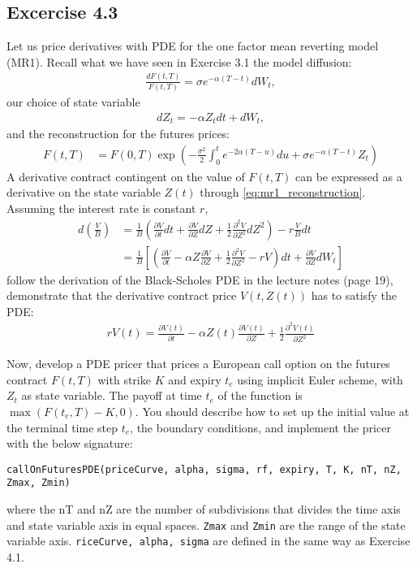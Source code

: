 \documentclass[10pt,a4paper,hidelinks,fleqn]{article}            %
\begin{document}
\subsection*{Excercise 4.3}
Let us price derivatives with PDE for the one factor mean reverting model (MR1). 
Recall what we have seen in Exercise 3.1 the model diffusion:
\begin{align*}
\frac{dF(t, T)}{F(t, T)} = \sigma e^{-\alpha (T- t)} dW_t,
\end{align*}
our choice of state variable
\begin{align}
dZ_t = -\alpha Z_t dt + dW_t,
\end{align}
and the reconstruction for the futures prices:
\begin{align}
F(t, T) & = F(0, T) \exp\left( -\frac{\sigma^2}{2} \int_0^t e^{-2\alpha (T - u)} du + \sigma e^{-\alpha(T-t)} Z_t \right)
\label{eq:mr1_reconstruction}
\end{align}
A derivative contract contingent on the value of $F(t, T)$ can be expressed as a derivative on the state variable $Z(t)$ through \eqref{eq:mr1_reconstruction}.
Assuming the interest rate is constant $r$,
\begin{align}
d\left(\frac{V}{B}\right) & = \frac{1}{B}\left(\frac{\partial V}{\partial t} dt + \frac{\partial V}{\partial Z} dZ + \frac{1}{2}\frac{\partial^2 V}{\partial Z^2} dZ^2 \right) - r\frac{V}{B}dt  \\
   & = \frac{1}{B} \left[\left(\frac{\partial V}{\partial t} - \alpha Z\frac{\partial V}{\partial Z} + \frac{1}{2} \frac{\partial^2 V}{\partial Z^2} - rV\right)dt + \frac{\partial V}{\partial Z} dW_t \right]
\end{align}
follow the derivation of the Black-Scholes PDE in the lecture notes (page 19),
demonstrate that the derivative contract price $V(t, Z(t))$ has to satisfy the PDE:
\begin{align}
rV(t) = \frac{\partial V(t)}{\partial t} - \alpha Z(t) \frac{\partial V(t)}{\partial Z} + \frac{1}{2} \frac{\partial^2 V(t)}{\partial Z^2}
\end{align}


Now, develop a PDE pricer that prices a European call option on the futures contract $F(t, T)$ with strike $K$ and expiry $t_e$ using implicit Euler scheme, with $Z_t$ as state variable.
The payoff at time $t_e$ of the function is $\max(F(t_e, T) - K, 0)$.
You should describe how to set up the initial value at the terminal time step $t_e$, the boundary conditions, and implement the pricer with the below signature:
\begin{verbatim}
callOnFuturesPDE(priceCurve, alpha, sigma, rf, expiry, T, K, nT, nZ, Zmax, Zmin)
\end{verbatim}
where the nT and nZ are the number of subdivisions that divides the time axis and state variable axis in equal spaces.
\verb=Zmax= and \verb=Zmin= are the range of the state variable axis. \verb=riceCurve, alpha, sigma= are defined in the same way as Exercise 4.1.
\end{document}

